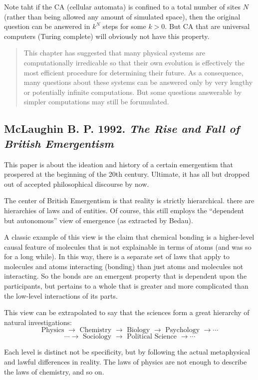 \documentclass{article}
\newcommand{\tx}[1]{\text{#1}}
\newcommand{\ti}[1]{\textit{#1}}
\newcommand{\annbibtitle}[2]{\subsection*{#1. \ti{#2}}}
\begin{document}
Note taht if the CA (cellular automata) is confined to a total number of sites $N$ (rather than being allowed any amount of simulated space), then the original question can be answered in $k^N$ steps for some $k > 0$. But CA that are universal computers (Turing complete) will obviously not have this property.

\begin{quote}
This chapter has suggested that many physical systems are computationally irredicable so that their own evolution is effectively the most efficient procedure for determining their future. As a consequence, many questions about these systems can be answered only by very lengthy or potentially infinite computations. But some questions answerable by simpler computations may still be forumulated.
\end{quote}

\annbibtitle{McLaughin B. P. 1992}{The Rise and Fall of British Emergentism}

This paper is about the ideation and history of a certain emergentism that prospered at the beginning of the 20th century. Ultimate, it has all but dropped out of accepted philosophical discourse by now.

The center of British Emergentism is that reality is strictly hierarchical. there are hierarchies of laws and of entities. Of course, this still employs the ``dependent but autonomous'' view of emergence (as extracted by Bedau).

A classic example of this view is the claim that chemical bonding is a higher-level causal feature of molecules that is not explainable in terms of atoms (and was so for a long while). In this way, there is a separate set of laws that apply to molecules and atoms interacting (bonding) than just atoms and molecules not interacting. So the bonds are an emergent property that is dependent upon the participants, but pertains to a whole that is greater and more complicated than the low-level interactions of its parts.

This view can be extrapolated to say that the sciences form a great hierarchy of natural investigations:
\[
    \tx{Physics } \rightarrow
    \tx{ Chemistry } \rightarrow
    \tx{ Biology } \rightarrow
    \tx{ Psychology } \rightarrow \cdots \] \[ \cdots \rightarrow
    \tx{ Sociology } \rightarrow
    \tx{ Political Science } \rightarrow \cdots
\]

Each level is distinct not be specificity, but by following the actual metaphysical and lawful differences in reality. The laws of physics are not enough to describe the laws of chemistry, and so on.
\end{document}
